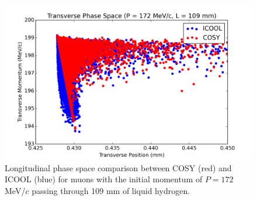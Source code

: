 \documentclass[a4paper,11pt]{article}
\begin{document}
\begin{figure}[htb]
\centering
\includegraphics[width=\columnwidth]{Figures/tof}
\caption{Longitudinal phase space comparison between COSY (red) and ICOOL (blue) for muons with the initial momentum of $P=172$ MeV/$c$ passing through 109 mm of liquid hydrogen.}
\label{fig:tof}
\end{figure}






\fi

\end{document}
